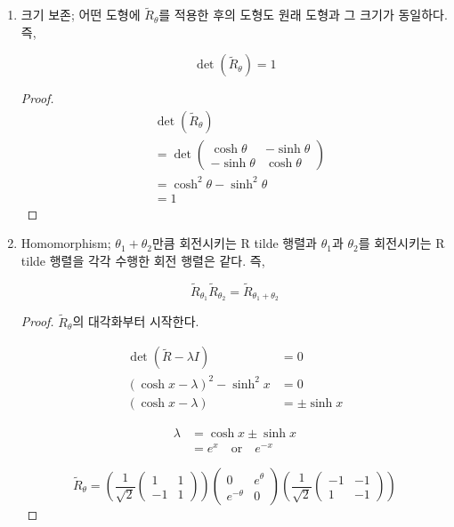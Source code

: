 \documentclass{thesis-SJ}
\begin{document}
\begin{enumerate}
	\item 크기 보존; 어떤 도형에 $\tilde{R}_\theta$를 적용한 후의 도형도 원래 도형과 그 크기가 동일하다. 즉,
	
	\begin{equation}
	\det(\tilde{R}_\theta) = 1
	\end{equation}
	
	\begin{proof}
		
		\begin{align*}
		&\det(\tilde{R}_\theta)\\
		&=\det\begin{pmatrix}
		\cosh \theta & -\sinh \theta \\
		-\sinh \theta & \cosh \theta 
		\end{pmatrix}\\
		&= \cosh^2{\theta} - \sinh^2{\theta} \\
		&= 1
		\end{align*}
	\end{proof}
	
	\item Homomorphism; $\theta_1+\theta_2$만큼 회전시키는 R tilde 행렬과 $\theta_1$과 $\theta_2$를 회전시키는 R tilde 행렬을 각각 수행한 회전 행렬은 같다. 즉,
	
	\begin{equation}
	\tilde{R}_{\theta_1}\tilde{R}_{\theta_2} =\tilde{R}_{\theta_1+\theta_2}
	\end{equation}
	
	\begin{proof}
		$\tilde{R}_\theta$의 대각화부터 시작한다.
		
		 \begin{align*}
		\det(\tilde{R}-\lambda I) &= 0 \\
		(\cosh{x}-\lambda)^2-\sinh^2{x} &= 0 \\
		(\cosh{x}-\lambda)&=\pm \sinh{x}
		\end{align*}
		
		 \begin{align*}
		\lambda &= \cosh{x} \pm \sinh{x} \\
		&= e^x \quad \text{or} \quad e^{-x}
		\end{align*}
		
		 \begin{equation}
		\tilde{R}_\theta = \left(\frac{1}{\sqrt{2}}\begin{pmatrix}
		1 & 1 \\ -1 & 1
		\end{pmatrix}\right) \begin{pmatrix}
		0 & e^\theta \\ e^{-\theta} & 0
		\end{pmatrix} \left(\frac{1}{\sqrt{2}}\begin{pmatrix}
		-1 & -1 \\ 1 & -1
		\end{pmatrix}\right)
		\end{equation}


\end{proof}
\end{enumerate}
\end{document}
